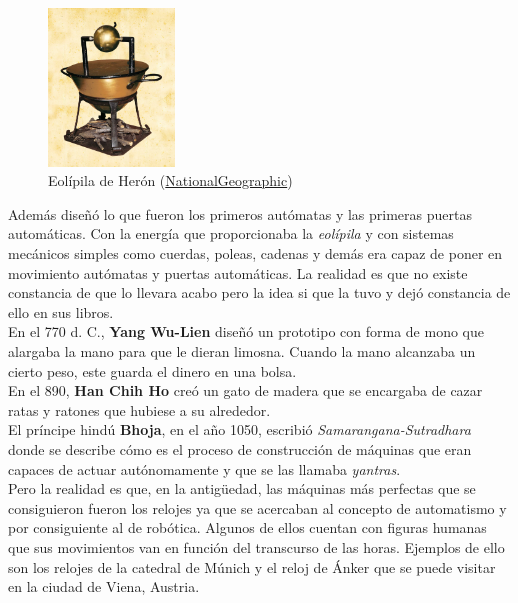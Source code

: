 \begin{figure}[H]
\begin{center}
  \includegraphics[width=0.3\textwidth]{./EtapaPrimeriza/imagenes/mv.jpg}
  \caption{Eolípila de Herón (\href{https://www.nationalgeographic.com.es/historia/grandes-reportajes/inventos-griegos\_9395}{NationalGeographic})}
  \label{mv}
\end{center}
\end{figure}

Además diseñó lo que fueron los primeros autómatas y las primeras puertas automáticas. Con la energía que proporcionaba la \textit{eolípila} y con sistemas mecánicos simples como cuerdas, poleas, cadenas y demás era capaz de poner en movimiento autómatas y puertas automáticas. La realidad es que no existe constancia de que lo llevara acabo pero la idea si que la tuvo y dejó constancia de ello en sus libros.\\


En el 770 d. C., \textbf{Yang Wu-Lien } diseñó un prototipo con forma de mono que alargaba la mano para que le dieran limosna. Cuando la mano alcanzaba un cierto peso, este guarda el dinero en una bolsa.\\



En el 890, \textbf{Han Chih Ho} creó un gato de madera que se encargaba de cazar ratas y ratones que hubiese a su alrededor.\\

El príncipe hindú \textbf{Bhoja}, en el año 1050, escribió \textit{Samarangana-Sutradhara} donde se describe cómo es el proceso de construcción de máquinas que eran capaces de actuar autónomamente y que se las llamaba \textit{yantras}.\\


Pero la realidad es que, en la antigüedad, las máquinas más perfectas que se consiguieron fueron los relojes ya que se acercaban al concepto de automatismo y por consiguiente al de robótica. Algunos de ellos cuentan con figuras humanas que sus movimientos van en función del transcurso de las horas. Ejemplos de ello son los relojes de la catedral de Múnich y el reloj de Ánker que se puede visitar en la ciudad de Viena, Austria.

